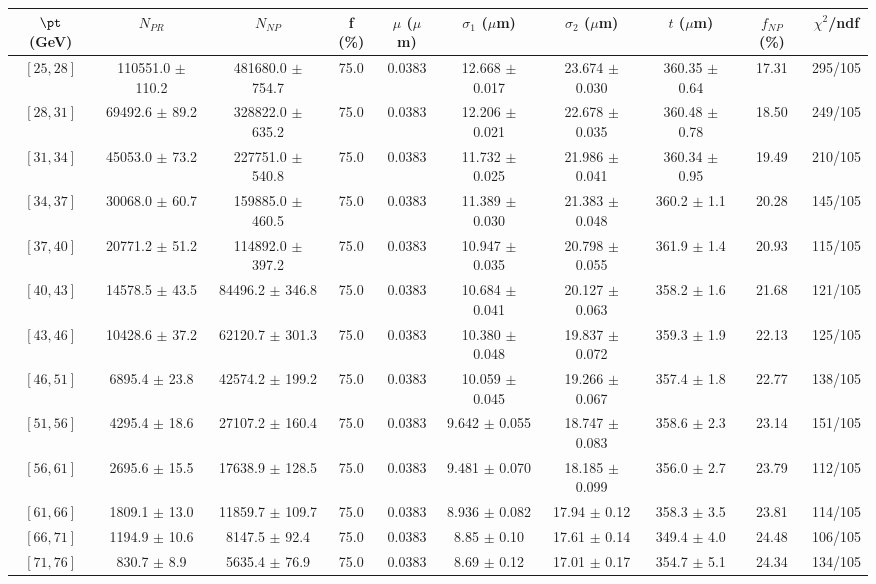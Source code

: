 \begin{tabular}{c||c|c|c|c|c|c|c||c|c}
$\pt$ (GeV) & $N_{PR}$ & $N_{NP}$ & f (\%) & $\mu$ ($\mu$m) & $\sigma_1$ ($\mu$m) & $\sigma_2$ ($\mu$m)  & $t$ ($\mu$m) & $f_{NP}$ (\%) & $\chi^2$/ndf \\
\hline
$[25, 28]$ & 110551.0 $\pm$ 110.2 & 481680.0 $\pm$ 754.7 & 75.0 & 0.0383 & 12.668 $\pm$ 0.017 & 23.674 $\pm$ 0.030 & 360.35 $\pm$ 0.64 & 17.31 & 295/105\\
$[28, 31]$ & 69492.6 $\pm$ 89.2 & 328822.0 $\pm$ 635.2 & 75.0 & 0.0383 & 12.206 $\pm$ 0.021 & 22.678 $\pm$ 0.035 & 360.48 $\pm$ 0.78 & 18.50 & 249/105\\
$[31, 34]$ & 45053.0 $\pm$ 73.2 & 227751.0 $\pm$ 540.8 & 75.0 & 0.0383 & 11.732 $\pm$ 0.025 & 21.986 $\pm$ 0.041 & 360.34 $\pm$ 0.95 & 19.49 & 210/105\\
$[34, 37]$ & 30068.0 $\pm$ 60.7 & 159885.0 $\pm$ 460.5 & 75.0 & 0.0383 & 11.389 $\pm$ 0.030 & 21.383 $\pm$ 0.048 & 360.2 $\pm$ 1.1 & 20.28 & 145/105\\
$[37, 40]$ & 20771.2 $\pm$ 51.2 & 114892.0 $\pm$ 397.2 & 75.0 & 0.0383 & 10.947 $\pm$ 0.035 & 20.798 $\pm$ 0.055 & 361.9 $\pm$ 1.4 & 20.93 & 115/105\\
$[40, 43]$ & 14578.5 $\pm$ 43.5 & 84496.2 $\pm$ 346.8 & 75.0 & 0.0383 & 10.684 $\pm$ 0.041 & 20.127 $\pm$ 0.063 & 358.2 $\pm$ 1.6 & 21.68 & 121/105\\
$[43, 46]$ & 10428.6 $\pm$ 37.2 & 62120.7 $\pm$ 301.3 & 75.0 & 0.0383 & 10.380 $\pm$ 0.048 & 19.837 $\pm$ 0.072 & 359.3 $\pm$ 1.9 & 22.13 & 125/105\\
$[46, 51]$ & 6895.4 $\pm$ 23.8 & 42574.2 $\pm$ 199.2 & 75.0 & 0.0383 & 10.059 $\pm$ 0.045 & 19.266 $\pm$ 0.067 & 357.4 $\pm$ 1.8 & 22.77 & 138/105\\
$[51, 56]$ & 4295.4 $\pm$ 18.6 & 27107.2 $\pm$ 160.4 & 75.0 & 0.0383 & 9.642 $\pm$ 0.055 & 18.747 $\pm$ 0.083 & 358.6 $\pm$ 2.3 & 23.14 & 151/105\\
$[56, 61]$ & 2695.6 $\pm$ 15.5 & 17638.9 $\pm$ 128.5 & 75.0 & 0.0383 & 9.481 $\pm$ 0.070 & 18.185 $\pm$ 0.099 & 356.0 $\pm$ 2.7 & 23.79 & 112/105\\
$[61, 66]$ & 1809.1 $\pm$ 13.0 & 11859.7 $\pm$ 109.7 & 75.0 & 0.0383 & 8.936 $\pm$ 0.082 & 17.94 $\pm$ 0.12 & 358.3 $\pm$ 3.5 & 23.81 & 114/105\\
$[66, 71]$ & 1194.9 $\pm$ 10.6 & 8147.5 $\pm$ 92.4 & 75.0 & 0.0383 & 8.85 $\pm$ 0.10 & 17.61 $\pm$ 0.14 & 349.4 $\pm$ 4.0 & 24.48 & 106/105\\
$[71, 76]$ & 830.7 $\pm$ 8.9 & 5635.4 $\pm$ 76.9 & 75.0 & 0.0383 & 8.69 $\pm$ 0.12 & 17.01 $\pm$ 0.17 & 354.7 $\pm$ 5.1 & 24.34 & 134/105\\

\end{tabular}
